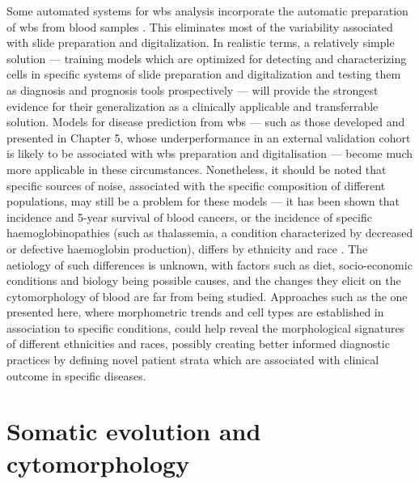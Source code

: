 Some automated systems for \ac{wbs} analysis incorporate the automatic preparation of \ac{wbs} from blood samples \cite{advia-120}. This eliminates most of the variability associated with slide preparation and digitalization. In realistic terms, a relatively simple solution --- training models which are optimized for detecting and characterizing cells in specific systems of slide preparation and digitalization and testing them as diagnosis and prognosis tools prospectively --- will provide the strongest evidence for their generalization as a clinically applicable and transferrable solution. Models for disease prediction from \ac{wbs} --- such as those developed and presented in Chapter 5, whose underperformance in an external validation cohort is likely to be associated with \ac{wbs} preparation and digitalisation --- become much more applicable in these circumstances. Nonetheless, it should be noted that specific sources of noise, associated with the specific composition of different populations, may still be a problem for these models --- it has been shown that incidence and 5-year survival of blood cancers, or the incidence of specific haemoglobinopathies (such as thalassemia, a condition characterized by decreased or defective haemoglobin production), differs by ethnicity and race \cite{Kirtane2017-dh,Lorey1996-yc}. The aetiology of such differences is unknown, with factors such as diet, socio-economic conditions and biology being possible causes, and the changes they elicit on the cytomorphology of blood are far from being studied. Approaches such as the one presented here, where morphometric trends and cell types are established in association to specific conditions, could help reveal the morphological signatures of different ethnicities and races, possibly creating better informed diagnostic practices by defining novel patient strata which are associated with clinical outcome in specific diseases.

\section{Somatic evolution and cytomorphology}

